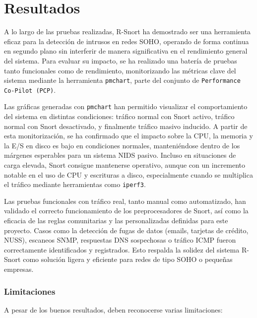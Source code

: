 \documentclass[11pt,a4paper,twoside]{report}
\begin{document}
\pagebreak

\chapter{Resultados}

A lo largo de las pruebas realizadas, R-Snort ha demostrado ser una herramienta eficaz para la detección de intrusos en redes SOHO, operando de forma continua en segundo plano sin interferir de manera significativa en el rendimiento general del sistema. Para evaluar su impacto, se ha realizado una batería de pruebas tanto funcionales como de rendimiento, monitorizando las métricas clave del sistema mediante la herramienta \texttt{pmchart}, parte del conjunto de \texttt{Performance Co-Pilot (PCP)}.\newline

Las gráficas generadas con \texttt{pmchart} han permitido visualizar el comportamiento del sistema en distintas condiciones: tráfico normal con Snort activo, tráfico normal con Snort desactivado, y finalmente tráfico masivo inducido. A partir de esta monitorización, se ha confirmado que el impacto sobre la CPU, la memoria y la E/S en disco es bajo en condiciones normales, manteniéndose dentro de los márgenes esperables para un sistema NIDS pasivo. Incluso en situaciones de carga elevada, Snort consigue mantenerse operativo, aunque con un incremento notable en el uso de CPU y escrituras a disco, especialmente cuando se multiplica el tráfico mediante herramientas como \texttt{iperf3}.\newline

Las pruebas funcionales con tráfico real, tanto manual como automatizado, han validado el correcto funcionamiento de los preprocesadores de Snort, así como la eficacia de las reglas comunitarias y las personalizadas definidas para este proyecto. Casos como la detección de fugas de datos (emails, tarjetas de crédito, NUSS), escaneos SNMP, respuestas DNS sospechosas o tráfico ICMP fueron correctamente identificados y registrados. Esto respalda la solidez del sistema R-Snort como solución ligera y eficiente para redes de tipo SOHO o pequeñas empresas.

\subsection*{Limitaciones}

A pesar de los buenos resultados, deben reconocerse varias limitaciones:
\end{document}
